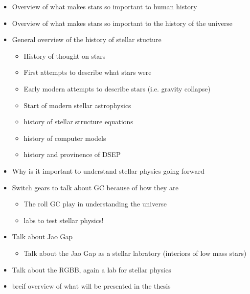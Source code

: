 \begin{itemize}
  \item Overview of what makes stars so important to human history
  \item Overview of what makes stars so important to the history of the universe 
  \item General overview of the history of stellar stucture
    \begin{itemize}
      \item History of thought on stars
      \item First attempts to describe what stars were
      \item Early modern attempts to describe stars (i.e. gravity collapse)
      \item Start of modern stellar astrophysics
      \item history of stellar structure equations
      \item history of computer models
      \item history and provinence of DSEP
    \end{itemize}
  \item Why is it important to understand stellar physics going forward
  \item Switch gears to talk about GC because of how they are
    \begin{itemize}
      \item The roll GC play in understanding the universe
      \item labs to test stellar physics!
    \end{itemize}
  \item Talk about Jao Gap
    \begin{itemize}
      \item Talk about the Jao Gap as a stellar labratory (interiors of low mass stars)
    \end{itemize}
  \item Talk about the RGBB, again a lab for stellar physics
  \item breif overview of what will be presented in the thesis
\end{itemize}
